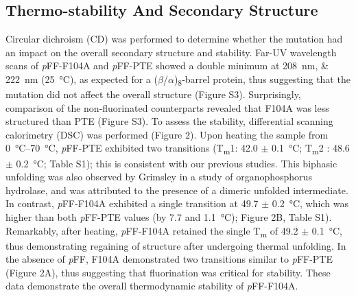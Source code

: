 \begin{refsection}
\subsection{Thermo-stability And Secondary Structure}

Circular dichroism (CD) was performed to determine whether the mutation had an
impact on the overall secondary structure and stability. Far-UV wavelength
scans of \emph{p}FF-F104A and \emph{p}FF-PTE showed a double minimum at
\SIlist{208;222}{\nm} (\SI{25}{\celsius}), as expected for a
($\beta$/$\alpha$)\textsubscript{8}-barrel protein, thus suggesting that the
mutation did not affect the overall structure (Figure S3).  Surprisingly,
comparison of the non-fluorinated counterparts revealed that F104A was less
structured than PTE (Figure S3). To assess the stability, differential scanning
calorimetry (DSC) was performed (Figure 2). Upon heating the sample from
\SIrange{0}{70}{\celsius}, \emph{p}FF-PTE exhibited two transitions
(T\textsubscript{m}1: 42.0 $\pm$ \SI{0.1}{\celsius}; T\textsubscript{m}2 : 48.6
$\pm$ \SI{0.2}{\celsius}; Table S1); this is consistent with our previous
studies.\cite{Baker2011b} This biphasic unfolding was also observed by Grimsley
  in a study of organophosphorus hydrolase, and was attributed to
the presence of a dimeric unfolded intermediate.\cite{Grimsley1997b} In
contrast, \emph{p}FF-F104A exhibited a single transition at 49.7 $\pm$
\SI{0.2}{\celsius}, which was higher than both \emph{p}FF-PTE values (by 7.7
and \SI{1.1}{\celsius}); Figure 2B, Table S1).  Remarkably, after heating,
\emph{p}FF-F104A retained the single T\textsubscript{m} of 49.2 $\pm$
\SI{0.1}{\celsius}, thus demonstrating regaining of structure after undergoing
thermal unfolding.  In the absence of \emph{p}FF, F104A demonstrated two
transitions similar to \emph{p}FF-PTE (Figure 2A), thus suggesting that
fluorination was critical for stability.  These data demonstrate the overall
thermodynamic stability of \emph{p}FF-F104A.


\end{refsection}

